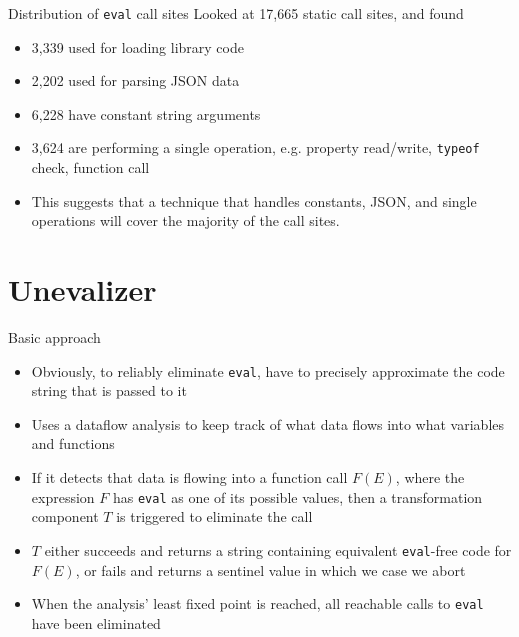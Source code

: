 \documentclass{beamer}
\begin{document}
\begin{frame}{Distribution of {\tt eval} call sites}
Looked at 17,665 static call sites, and found
\begin{itemize}
\item 3,339 used for loading library code
\item 2,202 used for parsing JSON data
\item 6,228 have constant string arguments
\item 3,624 are performing a single operation, e.g. property read/write,
{\tt typeof} check, function call
\item This suggests that a technique that handles constants, JSON, and
single operations will cover the majority of the call sites.
\end{itemize}
\end{frame}

\section{Unevalizer}

\begin{frame}{Basic approach}
\begin{itemize}
\item Obviously, to reliably eliminate {\tt eval}, have to precisely
approximate the code string that is passed to it
\item Uses a dataflow analysis to keep track of what data flows into what
variables and functions
\item If it detects that data is flowing into a function call $F(E)$,
where the expression $F$ has {\tt eval} as one of its possible values,
then a transformation component $T$ is triggered to eliminate the call
\item $T$ either succeeds and returns a string containing equivalent
{\tt eval}-free code for $F(E)$, or fails and returns a sentinel value
in which we case we abort
\item When the analysis' least fixed point is reached, all reachable
calls to {\tt eval} have been eliminated
\end{itemize}
\end{frame}
\end{document}
